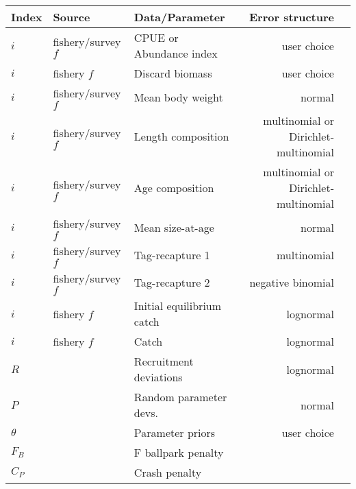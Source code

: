 \begin{longtable}{p{1cm} p{3.5cm} p{5.5cm} Rp{5cm}}
	\hline
	Index & Source & Data/Parameter & Error structure\Tstrut\Bstrut\\
	\hline	
	$i$ & fishery/survey $f$ & CPUE or Abundance index   & user choice \Tstrut\\
	$i$ & fishery $f$        & Discard biomass           & user choice \Tstrut\\
	$i$ & fishery/survey $f$ & Mean body weight          & normal \Tstrut\\
	$i$ & fishery/survey $f$ & Length composition        & multinomial or Dirichlet-multinomial\Tstrut\\
	$i$ & fishery/survey $f$ & Age composition           & multinomial or Dirichlet-multinomial\Tstrut\\
	$i$ & fishery/survey $f$ & Mean size-at-age          & normal \Tstrut\\
	$i$ & fishery/survey $f$ & Tag-recapture 1           & multinomial \Tstrut\\
	$i$ & fishery/survey $f$ & Tag-recapture 2           & negative binomial\Tstrut\\
	$i$ & fishery $f$        & Initial equilibrium catch & lognormal \Tstrut\\
	$i$ & fishery $f$        & Catch                     & lognormal \Tstrut\\
	$R$ & 					 & Recruitment deviations    & lognormal \Tstrut\\
	$P$ & 					 & Random parameter devs.    & normal \Tstrut\\
	$\theta$ & 				 & Parameter priors	         & user choice\Tstrut\\
	$F_B$ & 				 & F ballpark penalty	     &  \Tstrut\\
	$C_P$ &				     & Crash penalty             &  \Tstrut\Bstrut\\
	\hline
\end{longtable}




\pagebreak